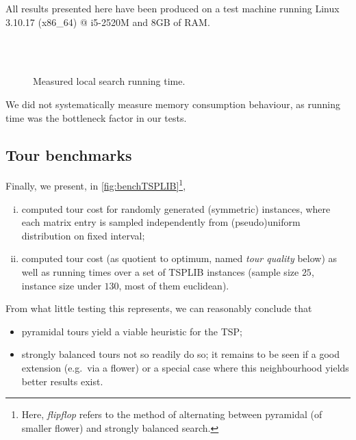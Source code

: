 \documentclass[index=totoc,bibliography=totoc]{scrartcl}
\numberwithin{equation}{section}
\numberwithin{figure}{section}
\numberwithin{table}{section}
\let\defstyle\itshape
\begin{document}
All results presented here have been produced on a test machine running
Linux 3.10.17 ({\ttfamily x86\_64}) @ i5-2520M and 8GB of RAM.

\begin{figure}[htbp]
\centering
  \null\hfill%
  \hfill\null
  \null\hfill%
  \hfill\null\\
  \null\hfill%
  \hfill\null\\
  \null\hfill%
  \hfill\null
  \null\hfill%
  \hfill\null
\caption{Measured local search running time.}
\label{fig:benchTIME}
\end{figure}

We did not systematically measure memory consumption behaviour, as running
time was the bottleneck factor in our tests.

\subsection{Tour benchmarks}

Finally, we present, in \cref{fig:benchTSPLIB}\footnote{%
  Here, {\defstyle flipflop} refers to the method of alternating
  between pyramidal (of smaller flower) and strongly balanced search.
},
\begin{enumerate}[(i)]
  \item
    computed tour cost for
    randomly generated (symmetric) instances,
    where each matrix entry is sampled independently from
    (pseudo)uniform distribution on fixed interval;
  \item computed tour cost (as quotient to optimum,
    named {\defstyle tour quality} below) as well as running times
    over a set of TSPLIB instances
    (sample size $25$, instance size under $130$, most of them euclidean).
\end{enumerate}
From what little testing this represents, we can reasonably conclude that
\begin{itemize}
  \item pyramidal tours yield a viable heuristic for the TSP;
  \item strongly balanced tours not so readily do so;
    it remains to be seen if a good extension (e.g.\ via a flower)
    or a special case where this neighbourhood yields better results
    exist.
\end{itemize}
\end{document}
